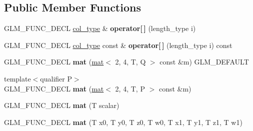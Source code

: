 \subsection*{Public Member Functions}
\begin{DoxyCompactItemize}
\item 
\mbox{\label{structglm_1_1mat_3_012_00_014_00_01T_00_01Q_01_4_a30332bf17d9c1668fcdc80e301cfe118}} 
G\+L\+M\+\_\+\+F\+U\+N\+C\+\_\+\+D\+E\+CL \hyperlink{structglm_1_1vec_3_014_00_01T_00_01Q_01_4}{col\+\_\+type} \& {\bfseries operator\mbox{[}$\,$\mbox{]}} (length\+\_\+type i)
\item 
\mbox{\label{structglm_1_1mat_3_012_00_014_00_01T_00_01Q_01_4_af5ccda8342646f7dea9fec3ed9088607}} 
G\+L\+M\+\_\+\+F\+U\+N\+C\+\_\+\+D\+E\+CL \hyperlink{structglm_1_1vec_3_014_00_01T_00_01Q_01_4}{col\+\_\+type} const  \& {\bfseries operator\mbox{[}$\,$\mbox{]}} (length\+\_\+type i) const
\item 
\mbox{\label{structglm_1_1mat_3_012_00_014_00_01T_00_01Q_01_4_a22729730c153b18ad67bd67c781fc8f0}} 
G\+L\+M\+\_\+\+F\+U\+N\+C\+\_\+\+D\+E\+CL {\bfseries mat} (\hyperlink{structglm_1_1mat}{mat}$<$ 2, 4, T, Q $>$ const \&m) G\+L\+M\+\_\+\+D\+E\+F\+A\+U\+LT
\item 
\mbox{\label{structglm_1_1mat_3_012_00_014_00_01T_00_01Q_01_4_ab060dac75cb1eb276cb14f35d4cb1898}} 
{\footnotesize template$<$qualifier P$>$ }\\G\+L\+M\+\_\+\+F\+U\+N\+C\+\_\+\+D\+E\+CL {\bfseries mat} (\hyperlink{structglm_1_1mat}{mat}$<$ 2, 4, T, P $>$ const \&m)
\item 
\mbox{\label{structglm_1_1mat_3_012_00_014_00_01T_00_01Q_01_4_a360145dcf88ae2510d11dc73966709ab}} 
G\+L\+M\+\_\+\+F\+U\+N\+C\+\_\+\+D\+E\+CL {\bfseries mat} (T scalar)
\item 
\mbox{\label{structglm_1_1mat_3_012_00_014_00_01T_00_01Q_01_4_a1804e116bb023b0d7c4f17fc2d0b16c8}} 
G\+L\+M\+\_\+\+F\+U\+N\+C\+\_\+\+D\+E\+CL {\bfseries mat} (T x0, T y0, T z0, T w0, T x1, T y1, T z1, T w1)

\end{DoxyCompactItemize}
